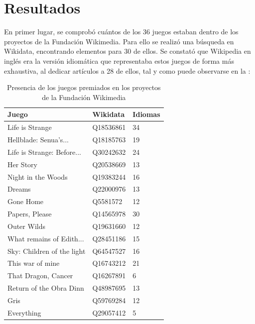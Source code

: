 \documentclass[spanish]{textolivre}
\begin{document}
\section{Resultados}

En primer lugar, se comprobó cuántos de los 36 juegos estaban dentro de los proyectos de la Fundación Wikimedia. Para ello se realizó una búsqueda en Wikidata, encontrando elementos para 30 de ellos. Se constató que Wikipedia en inglés era la versión idiomática que representaba estos juegos de forma más exhaustiva, al dedicar artículos a 28 de ellos, tal y como puede observarse en la :

\begin{table}[h!]
\centering
\begin{threeparttable}
\caption{Presencia de los juegos premiados en los proyectos de la Fundación Wikimedia}
\label{tab02}
\begin{tabular}{lll}
\toprule
Juego                            & Wikidata   & Idiomas \\ 
\midrule
Life 			is Strange               & Q18536861  & 34      \\ 
Hellblade: Senua’s...             & Q18185763  & 19      \\ 
Life 			is Strange: Before...     & Q30242632  & 24      \\ 
Her 			Story                     & Q20538669  & 13      \\ 
Night 			in the Woods            & Q19383244  & 16      \\ 
Dreams                           & Q22000976  & 13      \\ 
Gone 			Home                     & Q5581572   & 12      \\ 
Papers, 			Please                & Q14565978  & 30      \\ 
Outer 			Wilds                   & Q19631660  & 12      \\ 
What 			remains of Edith...      & Q28451186  & 15      \\ 
Sky: Children 			of the light     & Q64547527  & 16      \\ 
This 			war of mine              & Q16743212  & 21      \\ 
That 			Dragon, Cancer           & Q16267891  & 6       \\ 
Return 			of the Obra Dinn       & Q48987695  & 13      \\ 
Gris                             & Q59769284  & 12      \\ 
Everything                       & Q29057412  & 5       \\ 

\end{tabular}
\end{threeparttable}
\end{table}
\end{document}

